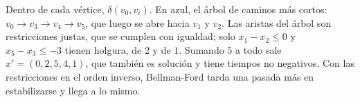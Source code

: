 \documentclass[11pt,letterpaper]{article}
\begin{document}
\begin{ejemplo}
\begin{center}
  \end{center}
  Dentro de cada vértice, $\delta(v_0, v_i)$. En azul, el árbol de
  caminos más cortos: $v_0 \to v_3 \to v_4 \to v_5$, que luego se
  abre hacia $v_1$ y $v_2$. Las aristas del árbol son restricciones
  justas, que se cumplen con igualdad; solo $x_1 - x_2 \le 0$ y
  $x_5 - x_3 \le -3$ tienen holgura, de $2$ y de $1$. Sumando $5$ a
  todo sale $x' = (0, 2, 5, 4, 1)$, que también es solución y tiene
  tiempos no negativos. Con las restricciones en el orden inverso,
  Bellman-Ford tarda una pasada más en estabilizarse y llega a lo
  mismo.
\end{ejemplo}
\end{document}
